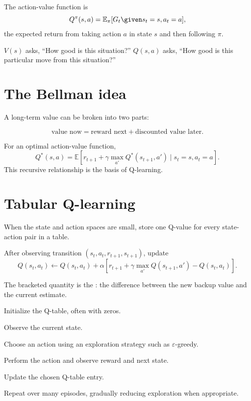The action-value function is
\[
  Q^{\pi}(s,a)=\mathbb{E}_{\pi}[G_t\given s_t=s,a_t=a],
\]
the expected return from taking action $a$ in state $s$ and then following $\pi$.

\begin{intuition}
$V(s)$ asks, ``How good is this situation?'' $Q(s,a)$ asks, ``How good is this particular move from this situation?''
\end{intuition}

\section{The Bellman idea}

A long-term value can be broken into two parts:

\[
\text{value now}=\text{reward next}+\text{discounted value later}.
\]

For an optimal action-value function,
\[
Q^*(s,a)=\mathbb{E}\left[r_{t+1}+\gamma\max_{a'}Q^*(s_{t+1},a')\mid s_t=s,a_t=a\right].
\]
This recursive relationship is the basis of Q-learning.

\section{Tabular Q-learning}

When the state and action spaces are small, store one Q-value for every state-action pair in a table.

After observing transition $(s_t,a_t,r_{t+1},s_{t+1})$, update
\[
Q(s_t,a_t)\leftarrow Q(s_t,a_t)+\alpha\left[r_{t+1}+\gamma\max_{a'}Q(s_{t+1},a')-Q(s_t,a_t)\right].
\]

The bracketed quantity is the : the difference between the new backup value and the current estimate.

\begin{mlsteps}
  \item Initialize the Q-table, often with zeros.
  \item Observe the current state.
  \item Choose an action using an exploration strategy such as $\varepsilon$-greedy.
  \item Perform the action and observe reward and next state.
  \item Update the chosen Q-table entry.
  \item Repeat over many episodes, gradually reducing exploration when appropriate.
\end{mlsteps}

